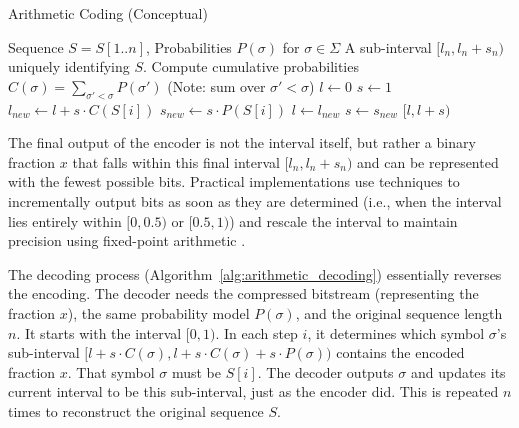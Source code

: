 \begin{algorithm}[hbtp] %
    \caption{Arithmetic Coding (Conceptual)} \label{alg:arithmetic_coding}
    \begin{algorithmic}[1] %
        \Require Sequence $S=S[1..n]$, Probabilities $P(\sigma)$ for $\sigma \in \Sigma$
        \Ensure A sub-interval $[l_n, l_n+s_n)$ uniquely identifying $S$.
        \State Compute cumulative probabilities $C(\sigma) = \sum_{\sigma' < \sigma} P(\sigma')$ (Note: sum over $\sigma' < \sigma$)
        \State $l \gets 0$
        \State $s \gets 1$ \Comment{Initial interval [0, 1), size 1}
        \State $l_{new} \gets l + s \cdot C(S[i])$ 
        \State $s_{new} \gets s \cdot P(S[i])$ 
        \State $l \gets l_{new}$
        \State $s \gets s_{new}$
        \EndFor
        \State \Return $[l, l+s)$ 
    \end{algorithmic}
\end{algorithm}

The final output of the encoder is not the interval itself, but rather a binary fraction $x$ that falls within this final interval $[l_n, l_n + s_n)$ and can be represented with the fewest possible bits. Practical implementations use techniques to incrementally output bits as soon as they are determined (i.e., when the interval lies entirely within $[0, 0.5)$ or $[0.5, 1)$) and rescale the interval to maintain precision using fixed-point arithmetic \cite{moffat1998arithmetic, ferragina2023pearls}.

The decoding process (Algorithm~\ref{alg:arithmetic_decoding}) essentially reverses the encoding. The decoder needs the compressed bitstream (representing the fraction $x$), the same probability model $P(\sigma)$, and the original sequence length $n$. It starts with the interval $[0, 1)$. In each step $i$, it determines which symbol $\sigma$'s sub-interval $[l + s \cdot C(\sigma), l + s \cdot C(\sigma) + s \cdot P(\sigma))$ contains the encoded fraction $x$. That symbol $\sigma$ must be $S[i]$. The decoder outputs $\sigma$ and updates its current interval to be this sub-interval, just as the encoder did. This is repeated $n$ times to reconstruct the original sequence $S$.

